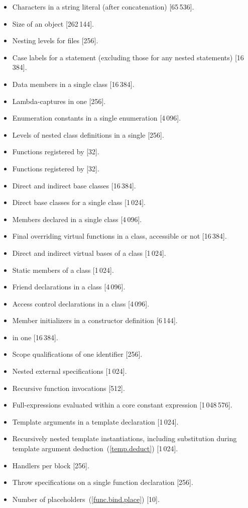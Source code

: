 \begin{paras}
\begin{itemize}
\item%
Characters in a string literal
(after concatenation) [65\,536].
\item%
Size of an object [262\,144].
\item%
Nesting levels for
files [256].
\item%
Case labels for a
statement (excluding those for any nested
statements)
[16\,384].
\item%
Data members in a single class [16\,384].
\item%
Lambda-captures in one  [256].
\item%
Enumeration constants in a single enumeration [4\,096].
\item%
Levels of nested class definitions
in a single
[256].
\item%
Functions registered by
 [32].
\item%
Functions registered by
 [32].
\item%
Direct and indirect base classes [16\,384].
\item%
Direct base classes for a single class [1\,024].
\item%
Members declared in a single class [4\,096].
\item%
Final overriding virtual functions in a class,
accessible or not [16\,384].
\item%
Direct and indirect virtual bases of a class [1\,024].
\item%
Static members of a class [1\,024].
\item%
Friend declarations in a class [4\,096].
\item%
Access control declarations in a class [4\,096].
\item%
Member initializers in a constructor definition [6\,144].
\item%
 in one  [16\,384].
\item%
Scope qualifications of one identifier [256].
\item%
Nested external specifications [1\,024].
\item%
Recursive  function invocations [512].
\item%
Full-expressions evaluated within a core constant expression [1\,048\,576].
\item%
Template arguments in a template declaration [1\,024].
\item%
Recursively nested template instantiations, including substitution
during template argument deduction~(\ref{temp.deduct}) [1\,024].
\item%
Handlers per
block [256].
\item%
Throw specifications on a single function declaration [256].

\item%
Number of placeholders~(\ref{func.bind.place}) [10].

\end{itemize}

\end{paras}
